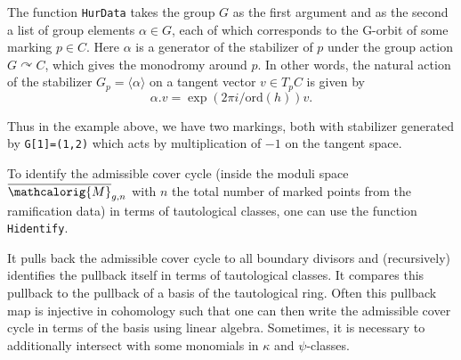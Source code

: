\documentclass[11pt]{article}
\newcommand{\M}{\ensuremath{\overline{\mathcalorig{M}}}}
\begin{document}
The function \verb|HurData| takes the group $G$ as the first argument and as the second a list of group elements $\alpha \in G$, each of which corresponds to the G-orbit of some marking $p \in C$. Here $\alpha$ is a generator of the stabilizer of $p$ under the group action $G \curvearrowright C$, which gives the monodromy around $p$. In other words, the natural action of the stabilizer $G_p = \langle \alpha \rangle$ on a tangent vector $v \in T_p C$ is given by \[\alpha . v = \exp(2 \pi i/\mathrm{ord}(h)) v.\]

Thus in the example above, we have two markings, both with stabilizer generated by \verb|G[1]=(1,2)| which acts by multiplication of $-1$ on the tangent space.

To identify the admissible cover cycle (inside the moduli space $\M_{g,n}$ with $n$ the total number of marked points from the ramification data) in terms of tautological classes, one can use the function \verb|Hidentify|.

It pulls back the admissible cover cycle to all boundary divisors and (recursively) identifies the pullback itself in terms of tautological classes. It compares this pullback to the pullback of a basis of the tautological ring. Often this pullback map is injective in cohomology such that one can then write the admissible cover cycle in terms of the basis using linear algebra. Sometimes, it is necessary to additionally intersect with some monomials in $\kappa$ and $\psi$-classes.
\end{document}
